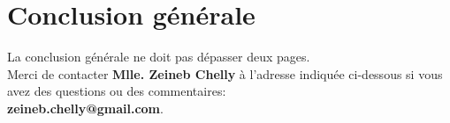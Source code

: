 \chapter*{Conclusion g\'{e}n\'{e}rale}
La conclusion g\'{e}n\'{e}rale ne doit pas d\'{e}passer deux pages. \\

Merci de  contacter \textbf{Mlle. Zeineb Chelly} \`{a} l'adresse indiqu\'{e}e ci-dessous si vous avez des questions ou des commentaires: \\

\textbf{zeineb.chelly@gmail.com}. 